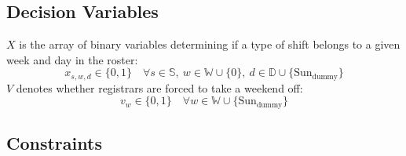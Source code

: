 \documentclass[a4paper]{article}
\begin{document}
\subsection{Decision Variables}

$X$ is the array of binary variables determining if a type of shift belongs to a given week and day in the roster:
$$x_{s, w, d} \in \{0, 1\} \quad\forall s\in \mathbb{S},\  w\in \mathbb{W} \cup \{0\},\ d\in \mathbb{D} \cup \{\text{Sun}_\text{dummy}\}$$
$V$ denotes whether registrars are forced to take a weekend off:
$$v_w \in \{0, 1\} \quad\forall w\in \mathbb{W} \cup \{\text{Sun}_\text{dummy}\}$$

\subsection{Constraints}
\end{document}
